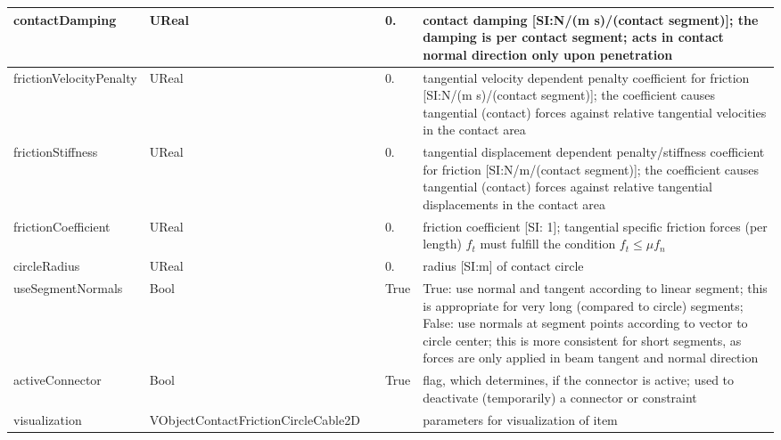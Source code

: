 \begin{center}
\begin{longtable}{| p{4.5cm} | p{2.5cm} | p{0.5cm} | p{2.5cm} | p{6cm} |}
    contactDamping &     UReal &      &     0. &     contact damping [SI:N/(m s)/(contact segment)]; the damping is per contact segment; acts in contact normal direction only upon penetration\\ \hline
    frictionVelocityPenalty &     UReal &      &     0. &     tangential velocity dependent penalty coefficient for friction [SI:N/(m s)/(contact segment)]; the coefficient causes tangential (contact) forces against relative tangential velocities in the contact area\\ \hline
    frictionStiffness &     UReal &      &     0. &     tangential displacement dependent penalty/stiffness coefficient for friction [SI:N/m/(contact segment)]; the coefficient causes tangential (contact) forces against relative tangential displacements in the contact area\\ \hline
    frictionCoefficient &     UReal &      &     0. &     friction coefficient [SI: 1]; tangential specific friction forces (per length) $f_t$ must fulfill the condition $f_t \le \mu f_n$\\ \hline
    circleRadius &     UReal &      &     0. &     radius [SI:m] of contact circle\\ \hline
    useSegmentNormals &     Bool &      &     True &      True: use normal and tangent according to linear segment; this is appropriate for very long (compared to circle) segments; False: use normals at segment points according to vector to circle center; this is more consistent for short segments, as forces are only applied in beam tangent and normal direction\\ \hline
    activeConnector &     Bool &      &     True &     flag, which determines, if the connector is active; used to deactivate (temporarily) a connector or constraint\\ \hline
    visualization &     VObjectContactFrictionCircleCable2D &      &      &     parameters for visualization of item\\ \hline
\end{longtable}
\end{center}

